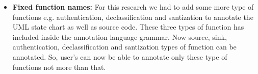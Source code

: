 \begin{itemize}
	\item \textbf{Fixed function names:} For this research we had to add some more type of functions e.g. authentication, declassification and santization to annotate the UML state chart as well as source code. These three types of function has included inside the annotation language grammar. Now source, sink, authentication, declassification and santization types of function can be annotated. So, user's can now be able to annotate only these type of functions not more than that.
	
\end{itemize}